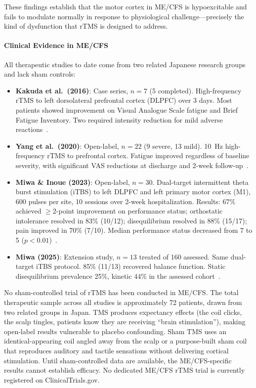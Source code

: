 These findings establish that the motor cortex in ME/CFS is hypoexcitable and fails to modulate normally in response to physiological challenge---precisely the kind of dysfunction that rTMS is designed to address.

\paragraph{Clinical Evidence in ME/CFS}

All therapeutic studies to date come from two related Japanese research groups and lack sham controls:

\begin{itemize}
    \item \textbf{Kakuda et al.\ (2016)}: Case series, $n=7$ (5 completed). High-frequency rTMS to left dorsolateral prefrontal cortex (DLPFC) over 3 days. Most patients showed improvement on Visual Analogue Scale fatigue and Brief Fatigue Inventory. Two required intensity reduction for mild adverse reactions~\cite{Kakuda2016rTMS}.

    \item \textbf{Yang et al.\ (2020)}: Open-label, $n=22$ (9 severe, 13 mild). 10~Hz high-frequency rTMS to prefrontal cortex. Fatigue improved regardless of baseline severity, with significant VAS reductions at discharge and 2-week follow-up~\cite{Yang2020rTMS}.

    \item \textbf{Miwa \& Inoue (2023)}: Open-label, $n=30$. Dual-target intermittent theta burst stimulation (iTBS) to left DLPFC and left primary motor cortex (M1), 600 pulses per site, 10 sessions over 2-week hospitalization. Results: 67\% achieved $\geq$2-point improvement on performance status; orthostatic intolerance resolved in 83\% (10/12); disequilibrium resolved in 88\% (15/17); pain improved in 70\% (7/10). Median performance status decreased from 7 to 5 ($p<0.01$)~\cite{Miwa2023rTMS}.

    \item \textbf{Miwa (2025)}: Extension study, $n=13$ treated of 160 assessed. Same dual-target iTBS protocol. 85\% (11/13) recovered balance function. Static disequilibrium prevalence 25\%, kinetic 44\% in the assessed cohort~\cite{Miwa2025rTMS}.
\end{itemize}

\begin{limitation}
\label{lim:tms-no-sham}
No sham-controlled trial of rTMS has been conducted in ME/CFS. The total therapeutic sample across all studies is approximately 72 patients, drawn from two related groups in Japan. TMS produces expectancy effects (the coil clicks, the scalp tingles, patients know they are receiving ``brain stimulation''), making open-label results vulnerable to placebo confounding. Sham TMS uses an identical-appearing coil angled away from the scalp or a purpose-built sham coil that reproduces auditory and tactile sensations without delivering cortical stimulation. Until sham-controlled data are available, the ME/CFS-specific results cannot establish efficacy. No dedicated ME/CFS rTMS trial is currently registered on ClinicalTrials.gov.
\end{limitation}

